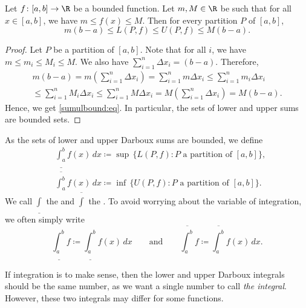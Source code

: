 \begin{prop} \label{sumulbound:prop}
Let $f \colon [a,b] \to \R$ be a bounded function.  Let $m, M \in \R$ be 
such that for all $x \in [a,b]$, we have $m \leq f(x) \leq M$.  Then for every partition $P$
of $[a,b]$,
\begin{equation}
\label{sumulbound:eq}
m(b-a) \leq
L(P,f) \leq U(P,f)
\leq M(b-a) .
\end{equation}
\end{prop}

\begin{proof}
Let $P$ be a partition of $[a,b]$.  Note that for all $i$, we
have $m \leq m_i \leq M_i \leq M$.  We also have
$\sum_{i=1}^n \Delta x_i = (b-a)$.  Therefore,
\begin{multline*}
m(b-a) =
m \left( \sum_{i=1}^n \Delta x_i \right)
=
\sum_{i=1}^n m \Delta x_i
\leq
\sum_{i=1}^n m_i \Delta x_i 
\\
\leq
\sum_{i=1}^n M_i \Delta x_i
\leq
\sum_{i=1}^n M \Delta x_i 
=
M \left( \sum_{i=1}^n \Delta x_i \right)
=
M(b-a) .
\end{multline*}
Hence, we get \eqref{sumulbound:eq}.  In particular, the sets of lower and
upper sums are bounded sets.
\end{proof}

\begin{defn}
As the sets of lower and upper Darboux sums are bounded, we define
\begin{align*}
& \underline{\int_a^b} f(x)\,dx \coloneqq
\sup \, \bigl\{ L(P,f) : P \text{ a partition of } [a,b] \bigr\} , \\
& \overline{\int_a^b} f(x)\,dx \coloneqq
\inf \, \bigl\{ U(P,f) : P \text{ a partition of } [a,b] \bigr\} .
\end{align*}
We call $\underline{\int}$
the \emph{} and
$\overline{\int}$ the
\emph{}.
To avoid worrying about the variable of integration, 
we often simply write
\begin{equation*}
\underline{\int_a^b} f \coloneqq
\underline{\int_a^b} f(x)\,dx 
\qquad \text{and} \qquad
\overline{\int_a^b} f \coloneqq
\overline{\int_a^b} f(x)\,dx  .
\end{equation*}
\end{defn}

If integration is to make sense, then the lower and upper Darboux
integrals should be the same number, as we want a single number to call
\emph{the integral}.  However, these two integrals may differ for
some functions.

